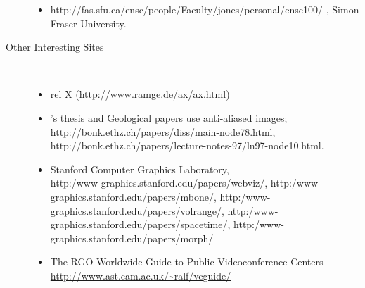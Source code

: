 \begin{description}
\begin{itemize}
\item 
{}%
{http://fas.sfu.ca/ensc/people/Faculty/jones/personal/ensc100/}%
, Simon Fraser University.
\html{\smallskip}%

\end{itemize}

\htmlrule[50\% center]



\item[Other Interesting Sites]~%
\begin{itemize}
%
\item {\large rel X} \quad
(\url{http://www.ramge.de/ax/ax.html})
\html{\smallskip}%

\item \Wortmann's thesis and Geological papers use anti-aliased images;\\ 
{http://bonk.ethz.ch/papers/diss/main-node78.html}, 
{http://bonk.ethz.ch/papers/lecture-notes-97/ln97-node10.html}.
\html{\smallskip}%

\item 
Stanford Computer Graphics Laboratory, 
\\
{http:/www-graphics.stanford.edu/papers/webviz/}, 
{http:/www-graphics.stanford.edu/papers/mbone/}, 
{http:/www-graphics.stanford.edu/papers/volrange/},
{http:/www-graphics.stanford.edu/papers/spacetime/},
{http:/www-graphics.stanford.edu/papers/morph/}


\item
The RGO Worldwide Guide to Public Videoconference Centers\\
\url{http://www.ast.cam.ac.uk/~ralf/vcguide/}
\html{\smallskip}%

\end{itemize}

\end{description}














